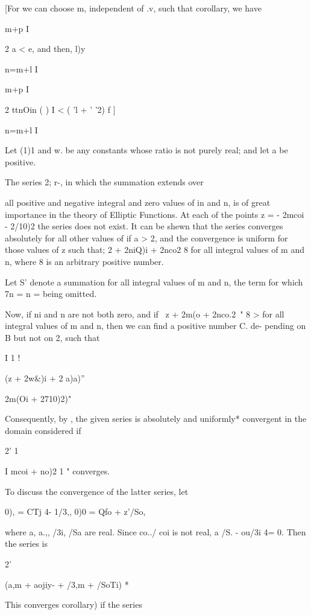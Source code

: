 %
%

[For we can choose m, independent of .v, such that corollary, we have

m+p I

2 a < e, and then, l)y 

n=m+l I

m+p I

2 ttnOin ( ) I < ( 'l + ' '2) f ]

n=m+l I


Let (1)1 and w. be any constants whose ratio is not purely real; and
let a be positive.

The series 2; r-, in which the summation extends over

all positive and negative integral and zero values of in and n, is of
great importance in the theory of Elliptic Functions. At each of the
points z = - 2mcoi - 2/10)2 the series does not exist. It can be shewn
that the series converges absolutely for all other values of if a > 2,
and the convergence is uniform for those values of z such that; 2 +
2niQ)i + 2nco2 8 for all integral values of m and n, where 8 is an
arbitrary positive number.

Let S' denote a summation for all integral values of m and n, the term
for which 7n = n = being omitted.

Now, if ni and n are not both zero, and if \ z + 2m(o + 2nco.2\ " 8 >
for all integral values of m and n, then we can find a positive number
C. de- pending on B but not on 2, such that

I 1 !

(z + 2w\&)i + 2 a)a)''

 2m(Oi + 2710)2)"

Consequently, by , the given series is absolutely and uniformly*
convergent in the domain considered if

2' 1

I mcoi + no)2 1 " converges.

To discuss the convergence of the latter series, let

0), = CTj 4- 1/3,, 0)0 = Qfo + z'/So,

where a, a.,, /3i, /Sa are real. Since co../ coi is not real, a /S. -
ou/3i 4= 0. Then the series is

2'

 (a,m + aojiy- + /3,m + /SoTi) *

This converges  corollary) if the series

